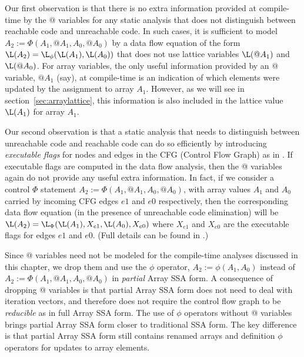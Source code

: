 Our first observation is that there is no extra information
provided at compile-time by the @ variables
for any static analysis that does not distinguish between reachable code
and unreachable code.  In such cases,
it is sufficient to model
$A_2 := \Phi(A_1, @A_1, A_0, @A_0)$ by
a data flow equation of the form $\L(A_2) = \L_{\phi}(\L(A_1), \L(A_0))$
that does not use lattice variables $\L(@A_1)$ and $\L(@A_0)$.
For array variables, the only useful information
provided by an @ variable, $@A_1$ (say), at compile-time is an indication
of which elements were updated by the assignment to array $A_1$.  
However, as we will see in section~\ref{sec:arraylattice}, this information
is also included in the lattice value $\L(A_1)$ for array $A_1$. 

Our second observation is that
a static analysis that needs to distinguish between unreachable
code and reachable code can do so efficiently
by introducing {\it executable flags} for nodes and edges in the
CFG (Control Flow Graph) as in \cite{WeZa91}.
If executable flags are computed in the data flow analysis, then
the @ variables again do not provide any useful extra information.
In fact, if we consider a control $\Phi$ statement
$A_2 := \Phi(A_1, @A_1, A_0, @A_0)$, with array values $A_1$ and $A_0$
carried by incoming CFG edges $e1$ and $e0$ respectively, then
the corresponding data flow equation (in the presence of unreachable code
elimination) will be 
$\L(A_2) = \L_{\Phi}(\L(A_1), X_{e1}, \L(A_0), X_{e0})$ where 
$X_{e1}$ and $X_{e0}$ are the executable flags for edges $e1$ and $e0$.
(Full details can be found in \cite{KnSa98b}.)

Since @ variables need not be modeled for the
compile-time analyses discussed in this chapter,
we drop them and use the
$\phi$ operator, $A_2 := \phi(A_1, A_0)$ instead of
$A_2 := \Phi(A_1, @A_1, A_0, @A_0)$ in {\it partial}
Array SSA form.  
A consequence of dropping @ variables is that partial Array
SSA form does not need to deal with iteration
vectors, and therefore does not require the control flow
graph to be {\it reducible} as in full Array SSA form.
The use of $\phi$ operators without @ variables brings
partial Array SSA form closer to traditional SSA form.
The key difference is that partial Array SSA form still contains 
renamed arrays and definition $\phi$ operators for updates to array elements.

